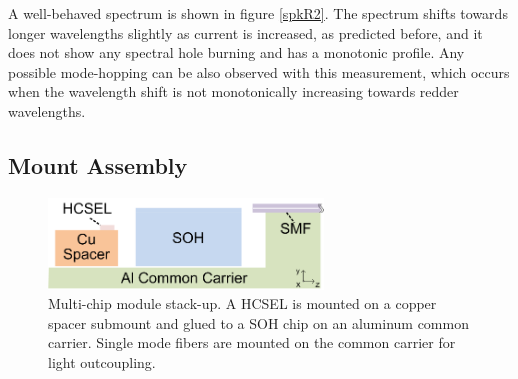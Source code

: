 A well-behaved spectrum is shown in figure \ref{spkR2}. The spectrum shifts towards longer wavelengths slightly as current is increased, as predicted before, and it does not show any spectral hole burning and has a monotonic profile. Any possible mode-hopping can be also observed with this measurement, which occurs when the wavelength shift is not monotonically increasing towards redder wavelengths. 


\subsection{Mount Assembly}
\label{sec:exp:massy}

\begin{figure}[!ht]
\centering
  \includegraphics[width=0.65\textwidth]{visio/MCM1-SU}
  \caption{Multi-chip module stack-up. A HCSEL is mounted on a copper spacer submount and glued to a SOH chip on an aluminum common carrier. Single mode fibers are mounted on the common carrier for light outcoupling.}
  \label{fig:MCM1-SUx}
\end{figure}

